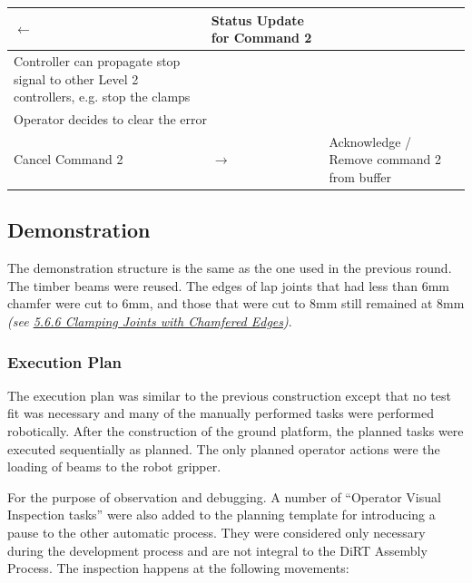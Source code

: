 \documentclass[11pt]{book}
\begin{document}
\begin{table}[H]
\begin{adjustbox}{max width=\textwidth}
\begin{tabular}{p{7.04cm}p{1.67cm}p{7.17cm}}
{{\footnotesize $\leftarrow$}} & 
\multicolumn{1}{|p{7.17cm}|}{{\footnotesize Status Update for Command 2}} \\ 
\hline
\multicolumn{1}{|p{7.04cm}}{{\footnotesize Controller can propagate stop signal to other Level 2 controllers, e.g. stop the clamps}} & 
\multicolumn{1}{|p{1.67cm}}{} & 
\multicolumn{1}{|p{7.17cm}|}{} \\ 
\hline
\multicolumn{3}{|p{15.87cm}|}{{\footnotesize Operator decides to clear the error}} \\ 
\hline
\multicolumn{1}{|p{7.04cm}}{{\footnotesize Cancel Command 2}} & 
\multicolumn{1}{|p{1.67cm}}{\centering
{\footnotesize $\rightarrow$}} & 
\multicolumn{1}{|p{7.17cm}|}{{\footnotesize Acknowledge / Remove command 2 from buffer}} \\ 
\hline
\end{tabular}
\end{adjustbox}
\end{table}
\vspace{3\baselineskip}
\subsection{Demonstration}

The demonstration structure is the same as the one used in the previous round. The timber beams were reused. The edges of lap joints that had less than 6mm chamfer were cut to 6mm, and those that were cut to 8mm still remained at 8mm \textit{\textcolor[HTML]{B7B7B7}{(see \uline{5.6.6 Clamping Joints with Chamfered Edges})}}. 

\subsubsection{Execution Plan}

The execution plan was similar to the previous construction except that no test fit was necessary and many of the manually performed tasks were performed robotically. After the construction of the ground platform, the planned tasks were executed sequentially as planned. The only planned operator actions were the loading of beams to the robot gripper. 

For the purpose of observation and debugging. A number of ``Operator Visual Inspection tasks'' were also added to the planning template for introducing a pause to the other automatic process. They were considered only necessary during the development process and are not integral to the DiRT Assembly Process. The inspection happens at the following movements:
\end{document}
